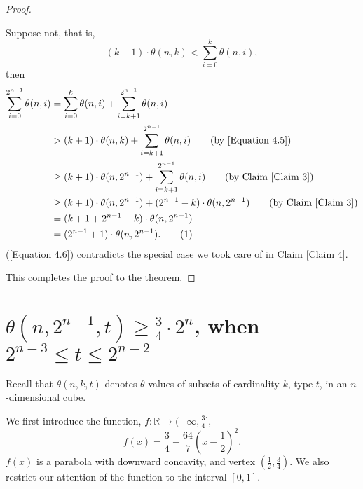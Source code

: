 \documentclass[12pt]{ucthesis}
\newcommand\numberthis{\addtocounter{equation}{1}\tag{\theequation}}
\theoremstyle{plain}
\theoremstyle{definition}
\begin{document}
\begin{proof}
\begin{enumerate}[(1)]
	Suppose not, that is,
	\begin{equation}
	\label{Equation 4.5}
	(k + 1) \cdot \theta(n, k) < \sum_{i = 0}^k \theta(n, i),
	\end{equation}
	then
	\begin{align*}
	\sum_{i = 0}^{2^{n - 1}} \theta(n, i)
	& = \sum_{i = 0}^k \theta(n, i) + \sum_{i = k + 1}^{2^{n - 1}} \theta(n, i) \\
	& > (k + 1) \cdot \theta(n, k) + \sum_{i = k + 1}^{2^{n - 1}} \theta(n, i) \tag{by \ref{Equation 4.5}} \\
	& \ge (k + 1) \cdot \theta(n, 2^{n - 1}) + \sum_{i = k + 1}^{2^{n - 1}} \theta(n, i) \tag{by Claim \ref{Claim 3}} \\
	& \ge (k + 1) \cdot \theta(n, 2^{n - 1}) + (2^{n - 1} - k) \cdot \theta(n, 2^{n - 1}) \tag{by Claim \ref{Claim 3}} \\
	& = (k + 1 + 2^{n - 1} - k) \cdot \theta(n, 2^{n - 1}) \\
	& = (2^{n - 1} + 1) \cdot \theta(n, 2^{n - 1}). \numberthis \label{Equation 4.6}
	\end{align*}
	(\ref{Equation 4.6}) contradicts the special case we took care of in Claim \ref{Claim 4}.
\end{enumerate}
This completes the proof to the theorem.
\end{proof}

\section{
  \texorpdfstring{
    $\theta(n, 2^{n - 1}, t) \ge \frac{3}{4} \cdot 2^n$, when $2^{n - 3} \le t \le 2^{n - 2}$
  }{
    theta(n, 2\{n - 1\}, t) >= 0.75 2\{n\}, when 2\{n - 3\} <= t <= 2\{n - 2\}
  }
}
\label{Section 4.2}

Recall that $\theta(n, k, t)$ denotes $\theta$ values of subsets of cardinality $k$,
type $t$, in an $n$-dimensional cube.

We first introduce the function,
$f \colon \mathbb{R} \rightarrow (-\infty, \frac{3}{4}]$,
\begin{equation*}
f(x) = \frac{3}{4} - \frac{64}{7} (x - \frac{1}{2})^2.
\end{equation*}
$f(x)$ is a parabola with downward concavity, and vertex $(\frac{1}{2}, \frac{3}{4})$.
We also restrict our attention of the function to the interval $[0, 1]$.
\end{document}
